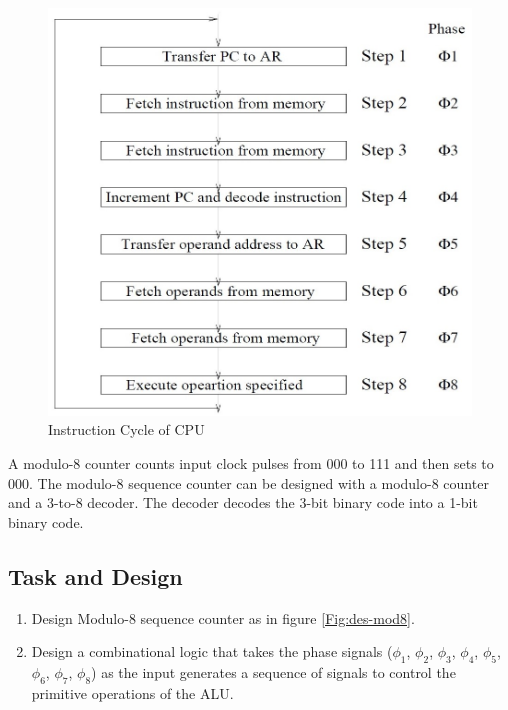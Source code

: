 \documentclass[a4paper]{article}
\begin{document}
\begin{figure}[h!]
    \centering
    \includegraphics[width=0.5\linewidth]{Pictures/Experiment 5/inst-cycle.jpg}
    \caption{Instruction Cycle of CPU}
    \label{fig:inst-cycle-CPU}
\end{figure}

\noindent A modulo-8 counter counts input clock pulses from 000 to 111 and then sets to 000. The modulo-8 sequence counter can be designed with a modulo-8 counter and a 3-to-8 decoder. The decoder decodes the 3-bit binary code into a 1-bit binary code.

\subsection{Task and Design}
\begin{enumerate}
    \item Design Modulo-8 sequence counter as in figure \ref{Fig:des-mod8}.
    \item Design a combinational logic that takes the phase signals ($\phi_1$, $\phi_2$, $\phi_3$, $\phi_4$, $\phi_5$, $\phi_6$, $\phi_7$, $\phi_8$) as the input generates a sequence of signals to control the primitive operations of the ALU.
\end{enumerate}
\end{document}
